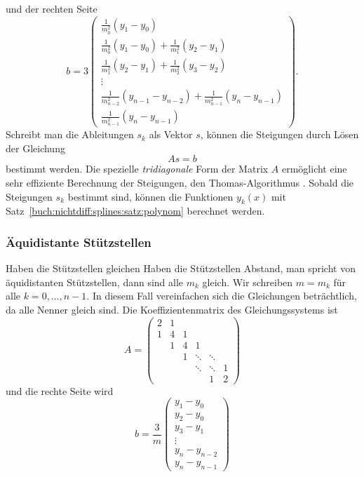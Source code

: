 und der rechten Seite
\[
\renewcommand{\arraystretch}{1.9}
b
=
3
\begin{pmatrix}
\displaystyle
\frac{1}{m_0^2}(y_1-y_0)
\\
\displaystyle
\frac{1}{m_0^2}(y_1-y_0)
+
\frac{1}{m_1^2}(y_2-y_1)
\\
\displaystyle
\frac{1}{m_1^2}(y_2-y_1)
+
\frac{1}{m_2^2}(y_3-y_2)
\\
\vdots
\\
\displaystyle
\frac{1}{m_{n-2}^2}(y_{n-1}-y_{n-2})
+
\frac{1}{m_{n-1}^2}(y_n-y_{n-1})
\\
\displaystyle
\frac{1}{m_{n-1}^2}(y_n-y_{n-1})
\end{pmatrix}.
\]
Schreibt man die Ableitungen $s_k$ als Vektor $s$, können die Steigungen
durch Lösen der Gleichung
\begin{equation}
As=b
\label{buch:nichtdiff:splines:eqn:gleichungssystem}
\end{equation}
bestimmt werden.
Die spezielle {\em tridiagonale} Form der Matrix $A$
%
ermöglicht eine sehr effiziente Berechnung der Steigungen, den
Thomas-Algorithmus \cite{buch:thomas}.
%
Sobald die Steigungen $s_k$ bestimmt sind, können die Funktionen
$y_k(x)$ mit Satz~\ref{buch:nichtdiff:splines:satz:polynom}
berechnet werden.

%
%
\subsubsection{Äquidistante Stützstellen}
Haben die Stützstellen gleichen Haben die Stützstellen Abstand, man
spricht von äquidistanten Stützstellen, dann sind alle $m_k$ gleich.
Wir schreiben $m=m_k$ für alle $k=0,\dots,n-1$.
In diesem Fall vereinfachen sich die Gleichungen beträchtlich, da
alle Nenner gleich sind.
Die Koeffizientenmatrix des Gleichungssystems ist
\[
A
=
\begin{pmatrix}
2 &1 &  &       &       &  \\
1 &4 &1 &       &       &  \\
  &1 &4 &1      &       &  \\[-3pt]
  &  &1 &\ddots &\ddots &  \\[-3pt]
  &  &  &\ddots &\ddots &1 \\
  &  &  &       &1      &2
\end{pmatrix}
\]
und die rechte Seite wird
\[
b
=
\frac{3}{m}
\begin{pmatrix}
y_1-y_0\\
y_2-y_0\\
y_3-y_1\\[-3pt]
\vdots\\
y_n-y_{n-2}\\
y_n-y_{n-1}
\end{pmatrix}
\]

